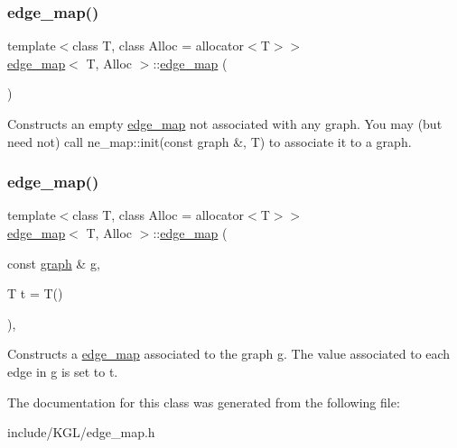 \subsubsection{\texorpdfstring{edge\+\_\+map()}{edge\_map()}\hspace{0.1cm}{\footnotesize\ttfamily [1/2]}}
{\footnotesize\ttfamily template$<$class T, class Alloc = allocator$<$\+T$>$$>$ \\
\mbox{\hyperlink{classedge__map}{edge\+\_\+map}}$<$ T, Alloc $>$\+::\mbox{\hyperlink{classedge__map}{edge\+\_\+map}} (\begin{DoxyParamCaption}{ }\end{DoxyParamCaption})\hspace{0.3cm}{\ttfamily [inline]}}

Constructs an empty {\ttfamily \mbox{\hyperlink{classedge__map}{edge\+\_\+map}}} not associated with any {\ttfamily graph}. You may (but need not) call {\ttfamily ne\+\_\+map\+::init(const graph \&, T)} to associate it to a {\ttfamily graph}. \mbox{\label{classedge__map_a30bd07fe13081b22071b721f66bb6796}} 
\subsubsection{\texorpdfstring{edge\+\_\+map()}{edge\_map()}\hspace{0.1cm}{\footnotesize\ttfamily [2/2]}}
{\footnotesize\ttfamily template$<$class T, class Alloc = allocator$<$\+T$>$$>$ \\
\mbox{\hyperlink{classedge__map}{edge\+\_\+map}}$<$ T, Alloc $>$\+::\mbox{\hyperlink{classedge__map}{edge\+\_\+map}} (\begin{DoxyParamCaption}\item[{const \mbox{\hyperlink{classgraph}{graph}} \&}]{g,  }\item[{T}]{t = {\ttfamily T()} }\end{DoxyParamCaption})\hspace{0.3cm}{\ttfamily [inline]}, {\ttfamily [explicit]}}

Constructs a {\ttfamily \mbox{\hyperlink{classedge__map}{edge\+\_\+map}}} associated to the graph {\ttfamily g}. The value associated to each edge in {\ttfamily g} is set to {\ttfamily t}. 

The documentation for this class was generated from the following file\+:\begin{DoxyCompactItemize}
\item 
include/\+K\+G\+L/edge\+\_\+map.\+h\end{DoxyCompactItemize}
